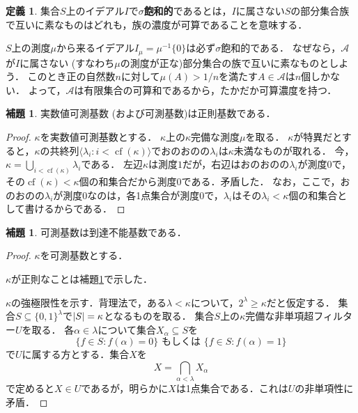 \documentclass[uplatex]{jsarticle}
\newcommand{\cf}{\operatorname{cf}}
\newcommand{\seq}[1]{{\langle#1\rangle}}
\DeclarePairedDelimiter\abs{\lvert}{\rvert}
\renewcommand\subset{\subseteq}
\theoremstyle{definition}
\newtheorem{defi}[thm]{定義}
\newtheorem{lem}[thm]{補題}
\begin{document}
	\begin{defi}
		集合$S$上のイデアル$I$で\textbf{$\sigma$飽和的}であるとは，$I$に属さない$S$の部分集合族で互いに素なものはどれも，族の濃度が可算であることを意味する．
	\end{defi}
	
	$S$上の測度$\mu$から来るイデアル$I_\mu = \mu^{-1}\{0\}$は必ず$\sigma$飽和的である．
	なぜなら，$\mathcal{A}$が$I$に属さない (すなわち$\mu$の測度が正な)部分集合の族で互いに素なものとしよう．
	このとき正の自然数$n$に対して$\mu(A) > 1/n$を満たす$A \in \mathcal{A}$は$n$個しかない．
	よって，$\mathcal{A}$は有限集合の可算和であるから，たかだか可算濃度を持つ．
	
	\begin{lem}\label{lem:measisreg}
		実数値可測基数 (および可測基数)は正則基数である．
	\end{lem}
	\begin{proof}
		$\kappa$を実数値可測基数とする．
		$\kappa$上の$\kappa$完備な測度$\mu$を取る．
		$\kappa$が特異だとすると，$\kappa$の共終列$\seq{\lambda_i : i < \cf(\kappa) }$でおのおのの$\lambda_i$は$\kappa$未満なものが取れる．
		今，$\kappa = \bigcup_{i < \cf(\kappa)} \lambda_i$である．
		左辺$\kappa$は測度$1$だが，右辺はおのおのの$\lambda_i$が測度$0$で，その$\cf(\kappa) < \kappa$個の和集合だから測度$0$である．矛盾した．
		なお，ここで，おのおのの$\lambda_i$が測度$0$なのは，各1点集合が測度$0$で，$\lambda_i$はその$\lambda_i < \kappa$個の和集合として書けるからである．
	\end{proof}

	\begin{lem}\label{lem:measisinacc}
		可測基数は到達不能基数である．
	\end{lem}
	\begin{proof}
		$\kappa$を可測基数とする．
		
		$\kappa$が正則なことは補題\ref{lem:measisreg}で示した．
		
		$\kappa$の強極限性を示す．背理法で，ある$\lambda < \kappa$について，$2^\lambda \ge \kappa$だと仮定する．
		集合$S \subset \{0, 1\}^\lambda$で$\abs{S} = \kappa$となるものを取る．
		集合$S$上の$\kappa$完備な非単項超フィルター$U$を取る．
		各$\alpha \in \lambda$について集合$X_\alpha \subset S$を
		\[
		\{ f \in S : f(\alpha) = 0 \} \text{ もしくは } \{ f \in S : f(\alpha) = 1 \}
		\]
		で$U$に属する方とする．集合$X$を
		\[
		X = \bigcap_{\alpha < \lambda} X_\alpha
		\]
		で定めると$X \in U$であるが，明らかに$X$は1点集合である．これは$U$の非単項性に矛盾．
	\end{proof}
	
\end{document}
